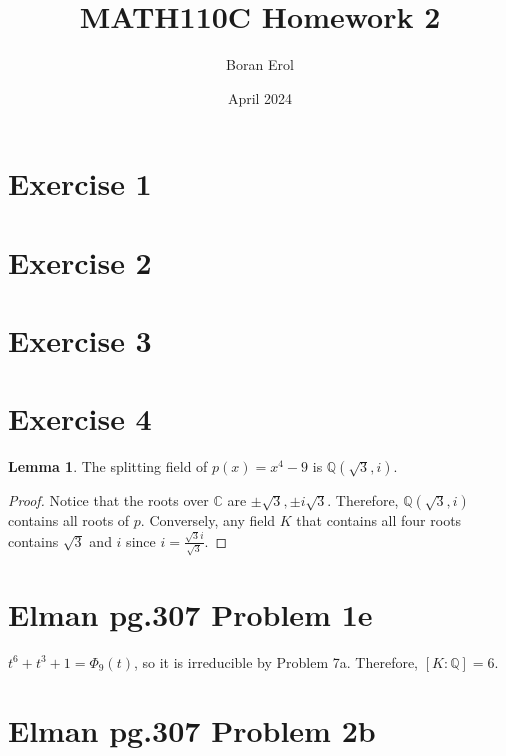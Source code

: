 \documentclass{article}
\title{MATH110C Homework 2}
\date{April 2024}
\author{Boran Erol}
\theoremstyle{definition}
\newtheorem{lemma}[theorem]{Lemma}
\newcommand{\Q}{\mathbb{Q}}
\newcommand{\C}{\mathbb{C}}
\begin{document}
\maketitle

\section{Exercise 1}

\newpage

\section{Exercise 2}

\newpage

\section{Exercise 3}

\newpage

\section{Exercise 4}

\begin{lemma}
    The splitting field of $p(x) = x^{4} - 9$ is $\Q(\sqrt{3},i)$.
\end{lemma}
\begin{proof}
    Notice that the roots over $\C$ are $\pm \sqrt{3}, \pm i \sqrt{3}$.
    Therefore, $\Q(\sqrt{3},i)$ contains all roots of $p$. Conversely,
    any field $K$ that contains all four roots contains $\sqrt{3}$ and $i$
    since $i = \frac{\sqrt{3}i}{\sqrt{3}}$.
\end{proof}

\newpage

\section{Elman pg.307 Problem 1e}

$t^{6} + t^{3} + 1 = \Phi_{9}(t)$, so it is irreducible by Problem 7a.
Therefore, $[K: \Q] = 6$.

\newpage

\section{Elman pg.307 Problem 2b}
\end{document}
